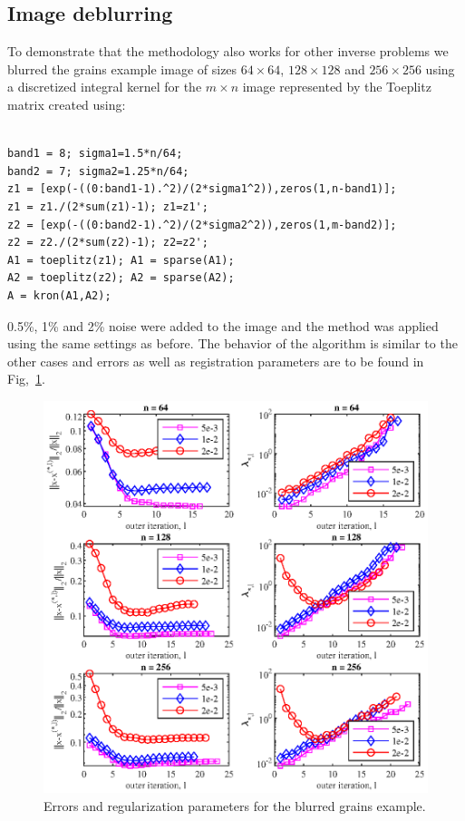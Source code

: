 \subsection{Image deblurring}
To demonstrate that the methodology also works for other inverse problems we blurred the grains example image of sizes $64 \times 64$, $128 \times 128$ and $256 \times 256$ using a discretized integral kernel for the $m \times n$ image represented by the Toeplitz matrix created using:
\begin{verbatim}

band1 = 8; sigma1=1.5*n/64; 
band2 = 7; sigma2=1.25*n/64;
z1 = [exp(-((0:band1-1).^2)/(2*sigma1^2)),zeros(1,n-band1)];
z1 = z1./(2*sum(z1)-1); z1=z1';
z2 = [exp(-((0:band2-1).^2)/(2*sigma2^2)),zeros(1,m-band2)];
z2 = z2./(2*sum(z2)-1); z2=z2';
A1 = toeplitz(z1); A1 = sparse(A1); 
A2 = toeplitz(z2); A2 = sparse(A2);
A = kron(A1,A2);

\end{verbatim}
0.5\%, 1\% and 2\% noise were added to the image and the method was applied using the same settings as before. The behavior of the algorithm is similar to the other cases and errors as well as registration parameters are to be found in Fig,~\ref{fig:grains_blurring_errs_and_reg_params}.
\begin{figure}[htbp]
\begin{center}
\includegraphics{figures/grains_blurring_errs_and_reg_params}
\caption{Errors and regularization parameters for the blurred grains example.}
\label{fig:grains_blurring_errs_and_reg_params}
\end{center}
\end{figure}

